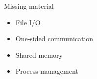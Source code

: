 \documentclass[11pt,headernav]{beamer}
\begin{document}
\begin{frame}{Missing material}
  \begin{itemize}
  \item File I/O
  \item One-sided communication
  \item Shared memory
  \item Process management
  \end{itemize}
\end{frame}

\begin{comment}
  \Level 0 {MPI File I/O}
  \Level 0 {One-sided communication}
  \Level 0 {Shared memory}
  \Level 0 {Process management}
\end{comment}
\end{document}
